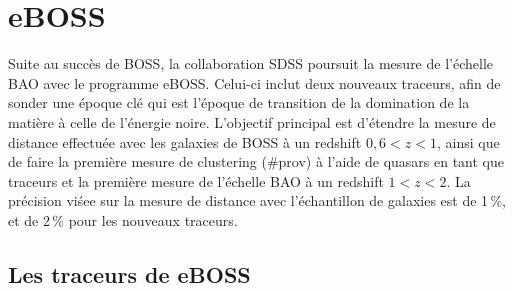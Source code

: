 \documentclass[11pt, twoside, a4paper, openright]{report}
\begin{document}
\section{eBOSS}

Suite au succès de BOSS, la collaboration SDSS poursuit la mesure de l'échelle BAO avec le programme eBOSS. Celui-ci inclut deux nouveaux traceurs, afin de sonder une époque clé qui est l'époque de transition de la domination de la matière à celle de l'énergie noire.
L'objectif principal est d'étendre la mesure de distance effectuée avec les galaxies de BOSS à un redshift $0,6 < z < 1$, ainsi que de faire la première mesure de clustering (\#prov) à l'aide de quasars en tant que traceurs et la première mesure de l'échelle BAO à un redshift $1 < z < 2$.
La précision viśee sur la mesure de distance avec l'échantillon de galaxies est de 1\,\%, et de 2\,\% pour les nouveaux traceurs.



\subsection{Les traceurs de eBOSS}
\end{document}
